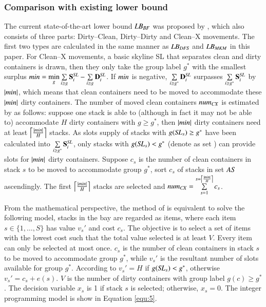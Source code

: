 \documentclass[review,3p,times,authoryear,12pt]{elsarticle}
\begin{document}
\subsubsection{Comparison with existing lower bound}
The current state-of-the-art lower bound $\id{LB}_\id{BF}$ was proposed by \cite{BF2012}, which also consists of three parts: Dirty--Clean, Dirty--Dirty and Clean--X movements.
The first two types are calculated in the same manner as $\id{LB}_\id{DFS}$ and $\id{LB}_\id{MKM}$ in this paper. For Clean--X movements, a basic skyline SL that separates clean and dirty containers is drawn, then they only take the group label $g^*$ with the smallest surplus $\id{min}=\min\limits_g\sum\limits_{i\ge g}\mathbf S^\id{SL}_i-\sum\limits_{i\ge g}\mathbf D^\id{SL}_i$. If $\id{min}$ is negative, $\sum\limits_{i\ge g^*}\mathbf D^\id{SL}_i$ surpasses $\sum\limits_{i\ge g^*}\mathbf S^\id{SL}_i$ by $|\id{min}|$, which means that clean containers need to be moved to accommodate these $|\id{min}|$ dirty containers. The number of moved clean containers $\id{num}_\id{CX}$ is estimated by \cite{BF2012} as follows: suppose one stack is able to (although in fact it may not be able to) accommodate $H$ dirty containers with $g\ge g^*$, then $|\id{min}|$ dirty containers need at least $\left\lceil\frac{|\id{min}|}{H}\right\rceil$ stacks. As slots supply of stacks with $g(\id{SL}_s)\ge g^*$ have been calculated into $\sum\limits_{i\ge g^*}\mathbf S^\id{SL}_i$, only stacks with $g(\id{SL}_s)< g^*$ (denote as set ) can provide slots for $|\id{min}|$ dirty containers. Suppose $c_s$ is the number of clean containers in stack $s$ to be moved to accommodate group $g^*$, sort $c_s$ of stacks in set $\id{AS}$ ascendingly. The first $\left\lceil\frac{|\id{min}|}{H}\right\rceil$ stacks are selected and $\id{num}_\id{CX}=\sum\limits_{s=1}^{s=\left\lceil\frac{|\id{min}|}{H}\right\rceil}c_s$.

From the mathematical perspective, the method of \cite{BF2012} is equivalent to solve the following model, stacks in the bay are regarded as items, where each item $s\in\{1,\dots,S\}$ has value $v_s'$ and cost $c_s$. The objective is to select a set of items with the lowest cost such that the total value selected is at least $V$. Every item can only be selected at most once. $c_s$ is the number of clean containers in stack $s$ to be moved to accommodate group $g^*$, while $v_s'$ is the resultant number of slots available for group $g^*$. According to \cite{BF2012} $v_s'=H$ if $g(\id{SL}_s)<g^*$, otherwise $v_s'=c_s+e(s)$. $V$ is the number of dirty containers with group label $g(c)\ge g^*$. The decision variable $x_s$ is 1 if stack $s$ is selected; otherwise, $x_s=0$. The integer programming model is show in Equation \ref{equ:5}.
\end{document}
